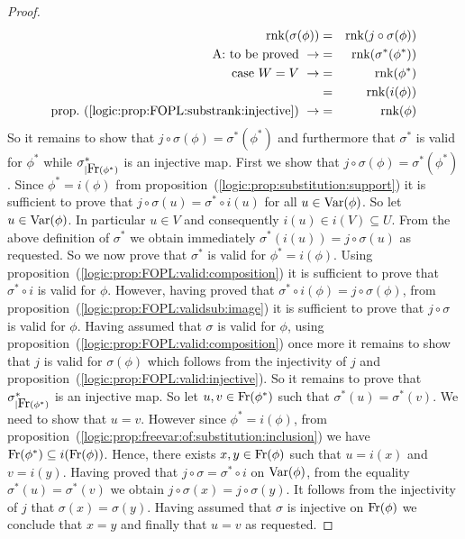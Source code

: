 \begin{proof}
\begin{eqnarray*}
    \rnk(\sigma(\phi))&=&\rnk(j\circ\sigma(\phi))\\
    \mbox{A: to be proved}\ \rightarrow&=&\rnk(\sigma^{*}(\phi^{*}))\\
    \mbox{case $W=V$}\ \rightarrow&=&\rnk(\phi^{*})\\
    &=&\rnk(i(\phi))\\
    \mbox{prop.~(\ref{logic:prop:FOPL:substrank:injective})}\ \rightarrow
    &=&\rnk(\phi)
    \end{eqnarray*}
So it remains to show that $j\circ\sigma(\phi)=\sigma^{*}(\phi^{*})$
and furthermore that $\sigma^{*}$ is valid for $\phi^{*}$ while
$\sigma^{*}_{|\mbox{\rm Fr}(\phi^{*})}$ is an injective map. First we show
that $j\circ\sigma(\phi)=\sigma^{*}(\phi^{*})$. Since
$\phi^{*}=i(\phi)$ from
proposition~(\ref{logic:prop:substitution:support}) it is sufficient
to prove that $j\circ\sigma(u)=\sigma^{*}\circ i(u)$ for all
$u\in\mbox{\rm Var}(\phi)$. So let $u\in\mbox{\rm Var}(\phi)$. In particular $u\in V$
and consequently $i(u)\in i(V)\subseteq U$. From the above
definition of $\sigma^{*}$ we obtain immediately
$\sigma^{*}(i(u))=j\circ\sigma(u)$ as requested. So we now prove
that $\sigma^{*}$ is valid for $\phi^{*}=i(\phi)$. Using
proposition~(\ref{logic:prop:FOPL:valid:composition}) it is
sufficient to prove that $\sigma^{*}\circ i$ is valid for $\phi$.
However, having proved that $\sigma^{*}\circ
i(\phi)=j\circ\sigma(\phi)$, from
proposition~(\ref{logic:prop:FOPL:validsub:image}) it is sufficient
to prove that $j\circ\sigma$ is valid for $\phi$. Having assumed
that $\sigma$ is valid for $\phi$, using
proposition~(\ref{logic:prop:FOPL:valid:composition}) once more it
remains to show that $j$ is valid for $\sigma(\phi)$ which follows
from the injectivity of $j$ and
proposition~(\ref{logic:prop:FOPL:valid:injective}). So it remains
to prove that $\sigma^{*}_{|\mbox{\rm Fr}(\phi^{*})}$ is an injective map.
So let $u,v\in \mbox{\rm Fr}(\phi^{*})$ such that
$\sigma^{*}(u)=\sigma^{*}(v)$. We need to show that $u=v$. However
 since $\phi^{*}=i(\phi)$, from
proposition~(\ref{logic:prop:freevar:of:substitution:inclusion}) we
have $\mbox{\rm Fr}(\phi^{*})\subseteq i(\mbox{\rm Fr}(\phi))$. Hence, there exists
$x,y\in\mbox{\rm Fr}(\phi)$ such that $u=i(x)$ and $v=i(y)$. Having proved
that $j\circ\sigma =\sigma^{*}\circ i$ on $\mbox{\rm Var}(\phi)$, from the
equality $\sigma^{*}(u)=\sigma^{*}(v)$ we obtain
$j\circ\sigma(x)=j\circ\sigma(y)$. It follows from the injectivity
of $j$ that $\sigma(x)=\sigma(y)$. Having assumed that $\sigma$ is
injective on $\mbox{\rm Fr}(\phi)$ we conclude that $x=y$ and finally that
$u=v$ as requested.
\end{proof}

